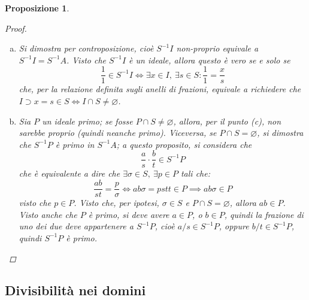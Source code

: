 \documentclass[12pt]{scrartcl}
\theoremstyle{style}
\newtheorem{prop}{Proposizione}[section]
\numberwithin{equation}{subsection}
\begin{document}
\begin{prop}
\begin{proof}
\begin{enumerate}[(a).]
	Allora, considerando $S^{-1}I$, questo contiene tutte le frazioni di $J$, per cui $x /s \in S^{-1}J \implies J \subseteq S^{-1}I$.
\item Si dimostra per controposizione, cio\`e $S^{-1}I$ non-proprio equivale a $S^{-1}I = S^{-1}A$.
	Visto che $S^{-1}I$ \`e un ideale, allora questo \`e vero se e solo se 
	\[
	\frac{1}{1} \in S^{-1}I \iff \exists x \in I, \ \exists s \in S : \frac{1}{1} = \frac{x}{s}
	\] 
	che, per la relazione definita sugli anelli di frazioni, equivale a richiedere che $I \supset x = s \in S \iff I \cap S \neq \varnothing$.
\item Sia $P$ un ideale primo; se fosse $P\cap S \neq \varnothing$, allora, per il punto (c), non sarebbe proprio (quindi neanche primo).
	Viceversa, se $P \cap S = \varnothing$, si dimostra che $S^{-1}P$ \`e primo in $S^{-1}A$; a questo proposito, si considera che
\[
\frac{a}{s}\cdot \frac{b}{t} \in S^{-1}P
\] 
che \`e equivalente a dire che $\exists \sigma \in S, \ \exists p \in P$ tali che:
\[
\frac{ab}{st} = \frac{p}{\sigma } \iff ab\sigma = p st t\in P \implies ab \sigma  \in P
\] 
visto che $p \in P$.
Visto che, per ipotesi, $\sigma \in S$ e $P\cap S = \varnothing$, allora $ab \in P$.
Visto anche che $P$ \`e primo, si deve avere $a \in P$, o $b \in P$, quindi la frazione di uno dei due deve appartenere a $S^{-1}P$, cio\`e $a / s \in S^{-1}P$, oppure $b / t \in S^{-1}P$, quindi $S^{-1}P$ \`e primo.
		\end{enumerate}
	\end{proof}
\end{prop}

\subsection{Divisibilit\`a nei domini}
\end{document}
